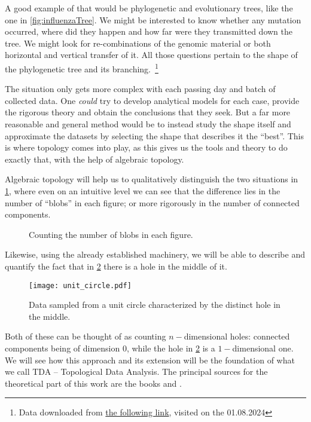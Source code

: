 A good example of that would be phylogenetic and evolutionary trees, like the one in \ref{fig:influenzaTree}. We might be interested to know whether any mutation occurred, where did they happen and how far were they transmitted down the tree. We might look for re-combinations of the genomic material or both horizontal and vertical transfer of it. All those questions pertain to the shape of the phylogenetic tree and its branching.\
\footnote{Data downloaded from \href{https://datadryad.org/stash/dataset/doi:10.5061/dryad.v15v0}{the following link},
visited on the 01.08.2024}
\par
The situation only gets more complex with each passing day and batch of collected data. One \textit{could} try to develop analytical models for each case, provide the rigorous theory and obtain the conclusions that they seek. But a far more reasonable and general method would be to instead study the shape itself and approximate the datasets by selecting the shape that describes it the ``best''. This is where topology comes into play, as this gives us the tools and theory to do exactly that, with the help of algebraic topology.
\par
Algebraic topology will help us to qualitatively distinguish the two situations in \ref{fig:Blobs}, where even on an intuitive level we can see that the difference lies in the number of ``blobs'' in each figure; or more rigorously in the number of connected components.

\begin{figure}[h]
  \centering
  \qquad
  \caption{Counting the number of blobs in each figure.}
  \label{fig:Blobs}
\end{figure}

Likewise, using the already established machinery, we will be able to describe and quantify the fact that in \ref{fig:unit_circle} there is a hole in the middle of it.

\begin{figure}[h]
  \caption{Data sampled from a unit circle characterized by the distinct hole in the middle.}
  \texttt{[image: unit\_circle.pdf]}
  \centering
  \label{fig:unit_circle}
\end{figure}

Both of these can be thought of as counting $n-$dimensional holes: connected components being of dimension $0$, while the hole in \ref{fig:unit_circle} is a $1-$dimensional one. We will see how this approach and its extension will be the foundation of what we call TDA -- Topological Data Analysis. The principal sources for the theoretical part of this work are the books \cite{dey2022computational} and \cite{rabadan2019topological}.
